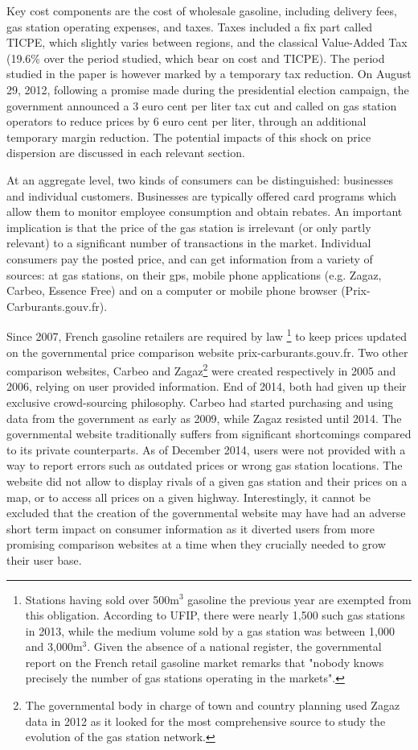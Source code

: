 \documentclass[english]{article}
\begin{document}
Key cost components are the cost of wholesale gasoline, including delivery fees,  gas station operating expenses, and taxes. Taxes included a fix part called TICPE, which slightly varies between regions, and the classical Value-Added Tax (19.6\% over the period studied, which bear on cost and TICPE). The period studied in the paper is however marked by a temporary tax reduction. On August 29, 2012, following a promise made during the presidential election campaign, the government announced a 3 euro cent per liter tax cut and called on gas station operators to reduce prices by 6 euro cent per liter, through an additional temporary margin reduction. The potential impacts of this shock on price dispersion are discussed in each relevant section.

At an aggregate level, two kinds of consumers can be distinguished: businesses and individual customers. Businesses are typically offered card programs which allow them to monitor employee consumption and obtain rebates. An important implication is that the price of the gas station is irrelevant (or only partly relevant) to a significant number of transactions in the market. Individual consumers pay the posted price, and can get information from a variety of sources: at gas stations, on their gps, mobile phone applications (e.g. Zagaz, Carbeo, Essence Free) and on a computer or mobile phone browser (Prix-Carburants.gouv.fr).

Since 2007, French gasoline retailers are required by law%
\footnote{Stations having sold over 500m$^{3}$ gasoline the previous year are exempted from this obligation. According to UFIP, there were nearly 1,500 such gas stations in 2013, while the medium volume sold by a gas station was between 1,000 and 3,000m$^{3}$. Given the absence of a national register, the governmental report \cite{BEL12} on the French retail gasoline market remarks that "nobody knows precisely the number of gas stations operating in the markets".}%
to keep prices updated on the governmental price comparison website prix-carburants.gouv.fr. Two other comparison websites, Carbeo and Zagaz\footnote{The governmental body in charge of town and country planning used Zagaz data in 2012 as it looked for the most comprehensive source to study the evolution of the gas station network.} were created respectively in 2005 and 2006, relying on user provided information. End of 2014, both had given up their exclusive crowd-sourcing philosophy. Carbeo had started purchasing and using data from the government as early as 2009, while Zagaz resisted until 2014. The governmental website traditionally suffers from significant shortcomings compared to its private counterparts. As of December 2014, users were not provided with a way to report errors such as outdated prices or wrong gas station locations. The website did not allow to display rivals of a given gas station and their prices on a map, or to access all prices on a given highway. Interestingly, it cannot be excluded that the creation of the governmental website may have had an adverse short term impact on consumer information as it diverted users from more promising comparison websites at a time when they crucially needed to grow their user base.
\end{document}
